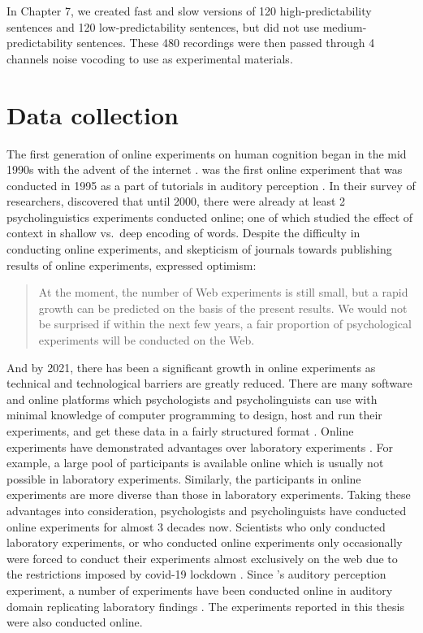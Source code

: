 \documentclass[a4paper, nobind]{templates/ociamthesis}
\begin{document}
In Chapter 7, we created fast and slow versions of 120 high-predictability sentences and 120 low-predictability sentences, but did not use medium-predictability sentences.
These 480 recordings were then passed through 4 channels noise vocoding to use as experimental materials.

\hypertarget{data-collection}{%
\section{Data collection}\label{data-collection}}

The first generation of online experiments on human cognition began in the mid 1990s \autocite[for reviews,][]{Musch2000} with the advent of the internet \autocite{Bernerslee1992}.
\textcite{Welch1996} was the first online experiment that was conducted in 1995 as a part of tutorials in auditory perception \autocite{Musch2000}.
In their survey of researchers, \textcite{Musch2000} discovered that until 2000, there were already at least 2 psycholinguistics experiments conducted online;
one of which studied the effect of context in shallow vs.~deep encoding of words.
Despite the difficulty in conducting online experiments, and skepticism of journals towards publishing results of online experiments,
\textcite{Musch2000} expressed optimism:

\begin{quote}
At the moment, the number of Web experiments is still small, but a rapid growth can be predicted on the basis of the present results.
We would not be surprised if within the next few years, a fair proportion of psychological experiments will be conducted on the Web.
\end{quote}

And by 2021, there has been a significant growth in online experiments as technical and technological barriers are greatly reduced.
There are many software and online platforms which psychologists and psycholinguists can use with minimal knowledge of computer programming
to design, host and run their experiments, and get these data in a fairly structured format \autocites{Peirce2019,Anwylirvine2020,Prolific}[see also,][]{Anwylirvine2021,Eyal2021}.
Online experiments have demonstrated advantages over laboratory experiments \autocite{Gadiraju2017,Johnson2021}.
For example, a large pool of participants is available online which is usually not possible in laboratory experiments.
Similarly, the participants in online experiments are more diverse than those in laboratory experiments.
Taking these advantages into consideration, psychologists and psycholinguists have conducted online experiments for almost 3 decades now.
Scientists who only conducted laboratory experiments, or who conducted online experiments only occasionally were forced to conduct their experiments almost exclusively on the web due to the restrictions imposed by covid-19 lockdown \autocite{Gagne2021,Reips2021}.
Since \textcite{Welch1996}'s auditory perception experiment, a number of experiments have been conducted online in auditory domain \autocite{Leensen2013,Woods2017,vanOs2021,Seow2022} replicating laboratory findings \autocite[e.g.,][]{Cooke2021}.
The experiments reported in this thesis were also conducted online.
\end{document}
